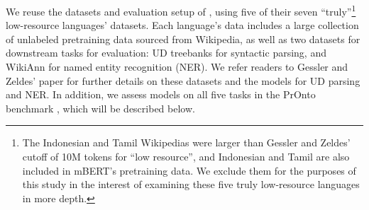 \documentclass[11pt]{article}
\begin{document}
We reuse the datasets and evaluation setup of \citet{gessler-zeldes-2022-microbert}, using five of their seven ``truly''\footnote{The Indonesian and Tamil Wikipedias were larger than Gessler and Zeldes' cutoff of 10M tokens for ``low resource'', and Indonesian and Tamil are also included in mBERT's pretraining data. We exclude them for the purposes of this study in the interest of examining these five truly low-resource languages in more depth.} low-resource languages' datasets. %
Each language's data includes a large collection of unlabeled pretraining data sourced from Wikipedia, as well as two datasets for downstream tasks for evaluation: UD treebanks for syntactic parsing, and WikiAnn \citep{pan-etal-2017-cross} for named entity recognition (NER).
We refer readers to Gessler and Zeldes' paper for further details on these datasets and the models for UD parsing and NER.
In addition, we assess models on all five tasks in the PrOnto benchmark \citep{gessler2023pronto}, which will be described below.
\end{document}
